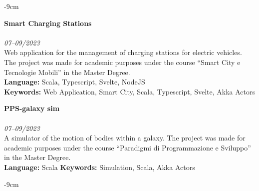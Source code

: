 \documentclass[10pt,a4paper]{altacv}
\begin{document}
\begin{adjustwidth}{}{-9cm}
    \divider

    \textbf{Smart Charging Stations}\\
    \\
    \textit{07--09/2023} \\ \smallskip
    Web application for the management of charging stations for electric vehicles. The project was made for academic purposes under the course ``Smart City e Tecnologie Mobili'' in the Master Degree.\\ \smallskip
    \textbf{Language:} Scala, Typescript, Svelte, NodeJS\\
    \textbf{Keywords:} Web Application, Smart City, Scala, Typescript, Svelte, Akka Actors

    \divider

    \textbf{PPS-galaxy sim}\\
    \\
    \textit{07--09/2023} \\ \smallskip
    A simulator of the motion of bodies within a galaxy. The project was made for academic purposes under the course ``Paradigmi di Programmazione e Sviluppo'' in the Master Degree.\\ \smallskip
    \textbf{Language:} Scala
    \textbf{Keywords:} Simulation, Scala, Akka Actors

\end{adjustwidth}

\begin{adjustwidth}{}{-9cm}


    \divider
\end{adjustwidth}
\end{document}
